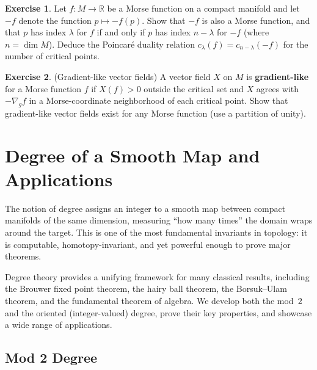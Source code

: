 \documentclass[12pt,a4paper,openany]{book}
\theoremstyle{definition}
\newtheorem{exercise}{Exercise}[chapter]
\theoremstyle{remark}
\newcommand{\R}{\mathbb{R}}
\begin{document}
\begin{exercise}\label{exo:morse-10}
Let $f\colon M \to \R$ be a Morse function on a compact manifold and
let $-f$ denote the function $p \mapsto -f(p)$. Show that $-f$ is
also a Morse function, and that $p$ has index $\lambda$ for $f$ if
and only if $p$ has index $n - \lambda$ for $-f$ (where $n = \dim M$).
Deduce the Poincar\'{e} duality relation $c_\lambda(f) = c_{n-\lambda}(-f)$
for the number of critical points.
\end{exercise}

\begin{exercise}\label{exo:morse-11}
(Gradient-like vector fields)
A vector field $X$ on $M$ is \textbf{gradient-like} for a Morse function
$f$ if $X(f) > 0$ outside the critical set and $X$ agrees with $-\nabla_g f$
in a Morse-coordinate neighborhood of each critical point.
Show that gradient-like vector fields exist for any Morse function
(use a partition of unity).
\end{exercise}



\chapter{Degree of a Smooth Map and Applications}\label{ch:degree}
\minitoc\vspace{1cm}

The notion of degree assigns an integer to a smooth map between
compact manifolds of the same dimension, measuring ``how many times''
the domain wraps around the target. This is one of the most fundamental
invariants in topology: it is computable, homotopy-invariant, and yet
powerful enough to prove major theorems.

Degree theory provides a unifying framework for many classical results,
including the Brouwer fixed point theorem, the hairy ball theorem,
the Borsuk--Ulam theorem, and the fundamental theorem of algebra.
We develop both the mod~$2$ and the oriented (integer-valued) degree,
prove their key properties, and showcase a wide range of applications.

\section{Mod 2 Degree}\label{sec:mod2-degree}
\end{document}
